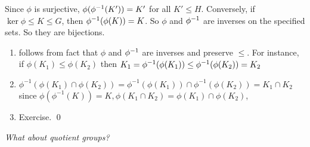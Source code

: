 \begin{pfno}
Since $\phi$ is surjective, $\phi(\phi^{-1}(K'))=K'$ for all $K'\le H$. Conversely, if $\ker\phi\le K\le G$, then $\phi^{-1}(\phi(K))=K$. So $\phi$ and $\phi^{-1}$ are inverses on the specified sets. So they are bijections.
\begin{enumerate}[label=(\alph*)]
\item follows from fact that $\phi$ and $\phi^{-1}$ are inverses and preserve $\le$. For instance, if $\phi(K_1)\le \phi(K_2)$ then $K_1=\phi^{-1}(\phi(K_1))\le \phi^{-1}(\phi(K_2))=K_2$
\item $\phi^{-1}\left(\phi\left(K_{1}\right) \cap \phi\left(K_{2}\right)\right)=\phi^{-1}\left(\phi\left(K_{1}\right)\right) \cap \phi^{-1}\left(\phi\left(K_{2}\right)\right)=K_{1} \cap K_{2}$ since $\phi\left(\phi^{-1}(K)\right)=K, \phi\left(K_{1} \cap K_{2}\right)=\phi\left(K_{1}\right) \cap \phi\left(K_{2}\right)$,
\item Exercise. \qed
\end{enumerate}
\end{pfno}

\textit{What about quotient groups?}


